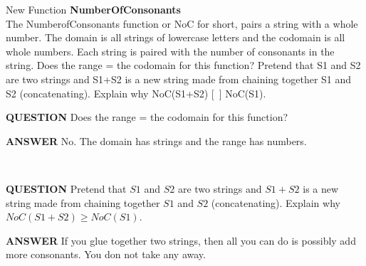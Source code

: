 \documentclass{ximera}
\begin{document}
\begin{exploration}
New Function \textbf{NumberOfConsonants}\\
The NumberofConsonants function or NoC for short, pairs a string with a whole number. The domain is all strings of lowercase letters and the codomain is all whole numbers. Each string is paired with the number of consonants in the string.
Does the range = the codomain for this function?
Pretend that S1 and S2 are two strings and S1+S2 is a new string made from chaining together S1 and S2 (concatenating).  Explain why NoC(S1+S2) [~] NoC(S1).
\quad \\

\begin{dialogue}
\item[\textbf{QUESTION}] Does the range = the codomain for this function?
\item[\textbf{ANSWER}] No. The domain has strings and the range has numbers.
\end{dialogue}

\quad \\


\begin{dialogue}
\item[\textbf{QUESTION}] Pretend that $S1$ and $S2$ are two strings and $S1+S2$ is a new string made from chaining together $S1$ and $S2$ (concatenating).  Explain why $NoC(S1+S2) \geq NoC(S1)$.
\item[\textbf{ANSWER}] If you glue together two strings, then all you can do is possibly add more consonants. You don not take any away.
\end{dialogue}

\end{exploration}
\end{document}
